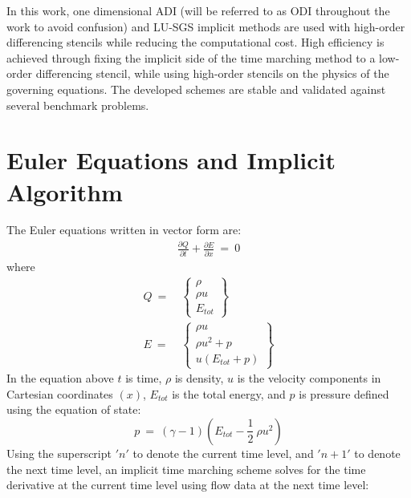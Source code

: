 \documentclass[conf]{new-aiaa}
\begin{document}
In this work, one dimensional ADI (will be referred to as ODI throughout the work to avoid confusion) and LU-SGS implicit methods are used with high-order differencing stencils while reducing the computational cost. 
High efficiency is achieved through fixing the implicit side of the time marching method to a low-order differencing stencil, while using high-order stencils on the physics of the governing equations. 
The developed schemes are stable and validated against several benchmark problems. 
\section{Euler Equations and Implicit Algorithm}
\label{sec:Euler}
The Euler equations written in vector form are:
\begin{equation}
	\begin{split}
		\label{eq:NS}
  			\frac{\partial{Q}}{\partial{t}} + \frac{\partial{E}}{\partial{x}}~=~0
	\end{split}
\end{equation}
where
\begin{equation}
	\begin{split}
		\label{eq:Q_E_Vectors}
  			Q~=&~\left\{\begin{matrix}
  				\rho \\
  				\rho u \\
  				E_{tot}
  			\end{matrix}\right\} \\
  			E~=&~\left\{\begin{matrix}
  				\rho u \\
  				\rho u^2+p \\
  				u(E_{tot}+p)
  			\end{matrix}\right\}
	\end{split}
\end{equation}
In the equation above $t$ is time, $\rho$ is density, $u$ is the velocity components in Cartesian coordinates $(x)$, $E_{tot}$ is the total energy, and $p$ is pressure defined using the equation of state:
\begin{equation*}
	p~=~\left(\gamma-1\right)\left(E_{tot}-\frac{1}{2}~\rho u^2	\right)
\end{equation*} 
Using the superscript $'n'$ to denote the current time level, and $'n+1'$ to denote the next time level, an implicit time marching scheme solves for the time derivative at the current time level using flow data at the next time level:
\end{document}
